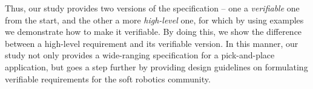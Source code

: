 \documentclass[lettersize,journal]{IEEEtran}
\begin{document}
%

Thus, our study provides two versions of the specification -- one a \emph{verifiable} one from the start, and the other a more \emph{high-level} one, for which by using examples we demonstrate how to make it verifiable. 
By doing this, we show the difference between a high-level requirement and its verifiable version. 
In this manner, our study not only provides a wide-ranging specification for a pick-and-place application, but goes a step further by providing design guidelines on formulating verifiable requirements for the soft robotics community. %




%
%
%
%
%
%
%
\end{document}
